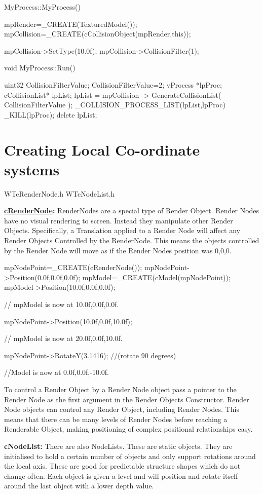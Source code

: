 \begin{DoxyCode}
 MyProcess::MyProcess()
 {
  mpRender=_CREATE(TexturedModel());
  mpCollision=_CREATE(cCollisionObject(mpRender,this));

  mpCollision->SetType(10.0f);
  mpCollision->CollisionFilter(1);
 }

 void MyProcess::Run()
 {
 uint32 CollisionFilterValue;
 CollisionFilterValue=2;
  vProcess *lpProc;
  cCollisionList* lpList;
  lpList = mpCollision -> GenerateCollisionList( CollisionFilterValue );
        _COLLISION_PROCESS_LIST(lpList,lpProc)
        {
                                _KILL(lpProc);
        }
        delete lpList;

 }
\end{DoxyCode}
 \hypertarget{_using_engine_page_RenderNodesPage}{}\section{Creating Local Co-\/ordinate systems}\label{_using_engine_page_RenderNodesPage}
WTcRenderNode.h WTcNodeList.h

{\bfseries  \hyperlink{classc_render_node}{cRenderNode}: } RenderNodes are a special type of Render Object. Render Nodes have no visual rendering to screen. Instead they manipulate other Render Objects. Specifically, a Translation applied to a Render Node will affect any Render Objects Controlled by the RenderNode. This means the objects controlled by the Render Node will move as if the Render Nodes position was 0,0,0.


\begin{DoxyCode}
 mpNodePoint=_CREATE(cRenderNode());
 mpNodePoint->Position(0.0f,0.0f,0.0f);
 mpModel=_CREATE(cModel(mpNodePoint));
 mpModel->Position(10.0f,0.0f,0.0f);

 // mpModel is now at 10.0f,0.0f,0.0f.

 mpNodePoint->Position(10.0f,0.0f,10.0f);

 // mpModel is now at 20.0f,0.0f,10.0f.

 mpNodePoint->RotateY(3.1416); //(rotate 90 degrees)

 //Model is now at 0.0f,0.0f,-10.0f.
\end{DoxyCode}


To control a Render Object by a Render Node object pass a pointer to the Render Node as the first argument in the Render Objects Constructor. Render Node objects can control any Render Object, including Render Nodes. This means that there can be many levels of Render Nodes before reaching a Renderable Object, making positioning of complex positional relationships easy. \par
 \par
 {\bfseries  cNodeList:} There are also NodeLists. These are static objects. They are initialised to hold a certain number of objects and only support rotations around the local axis. These are good for predictable structure shapes which do not change often. Each object is given a level and will position and rotate itself around the last object with a lower depth value.


